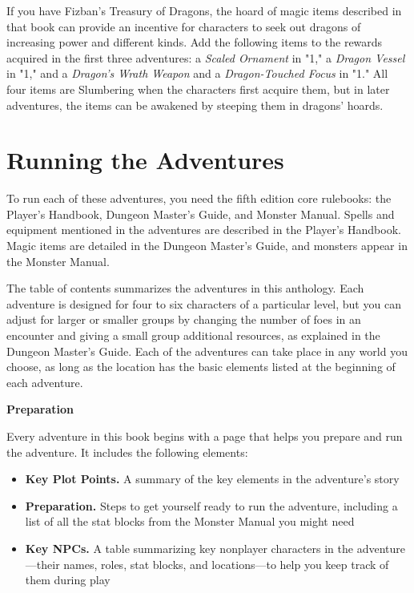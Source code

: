 \documentclass[letterpaper, 11pt, twocolumn]{dndbook}
\begin{document}
If you have Fizban's Treasury of Dragons, the hoard of magic items described in that book can provide an incentive for characters to seek out dragons of increasing power and different kinds. Add the following items to the rewards acquired in the first three adventures: a \textit{Scaled Ornament} in "1," a \textit{Dragon Vessel} in "1," and a \textit{Dragon's Wrath Weapon} and a \textit{Dragon-Touched Focus} in "1." All four items are Slumbering when the characters first acquire them, but in later adventures, the items can be awakened by steeping them in dragons' hoards.
\section{Running the Adventures}

To run each of these adventures, you need the fifth edition core rulebooks: the Player's Handbook, Dungeon Master's Guide, and Monster Manual. Spells and equipment mentioned in the adventures are described in the Player's Handbook. Magic items are detailed in the Dungeon Master's Guide, and monsters appear in the Monster Manual.

The table of contents summarizes the adventures in this anthology. Each adventure is designed for four to six characters of a particular level, but you can adjust for larger or smaller groups by changing the number of foes in an encounter and giving a small group additional resources, as explained in the Dungeon Master's Guide. Each of the adventures can take place in any world you choose, as long as the location has the basic elements listed at the beginning of each adventure.

\textbf{Preparation}

Every adventure in this book begins with a page that helps you prepare and run the adventure. It includes the following elements:

\begin{itemize}
\item \textbf{Key Plot Points.} A summary of the key elements in the adventure's story
\item \textbf{Preparation.} Steps to get yourself ready to run the adventure, including a list of all the stat blocks from the Monster Manual you might need
\item \textbf{Key NPCs.} A table summarizing key nonplayer characters in the adventure---their names, roles, stat blocks, and locations---to help you keep track of them during play
\end{itemize}
\end{document}
